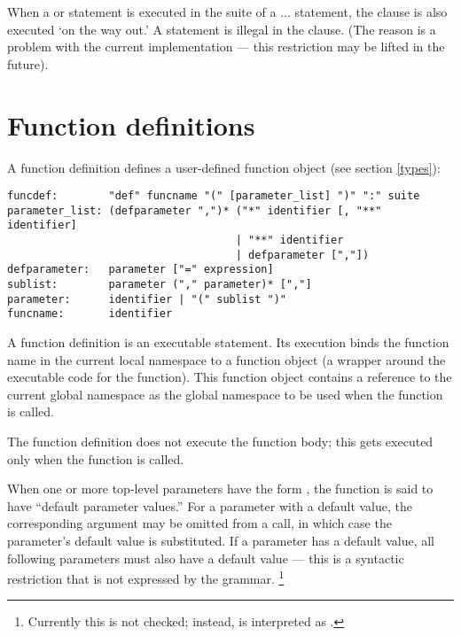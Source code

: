 When a  or  statement is executed in the
 suite of a ... statement, the
 clause is also executed `on the way out.'  A
 statement is illegal in the  clause.  (The
reason is a problem with the current implementation --- this
restriction may be lifted in the future).

\section{Function definitions\label{function}}

A function definition defines a user-defined function object (see
section \ref{types}):

\begin{verbatim}
funcdef:        "def" funcname "(" [parameter_list] ")" ":" suite
parameter_list: (defparameter ",")* ("*" identifier [, "**" identifier] 
                                    | "**" identifier 
                                    | defparameter [","])
defparameter:   parameter ["=" expression]
sublist:        parameter ("," parameter)* [","]
parameter:      identifier | "(" sublist ")"
funcname:       identifier
\end{verbatim}

A function definition is an executable statement.  Its execution binds
the function name in the current local namespace to a function object
(a wrapper around the executable code for the function).  This
function object contains a reference to the current global namespace
as the global namespace to be used when the function is called.

The function definition does not execute the function body; this gets
executed only when the function is called.

When one or more top-level parameters have the form 
\code{=} , the function is said to have ``default
parameter values.''  For a parameter with a
default value, the corresponding argument may be omitted from a call,
in which case the parameter's default value is substituted.  If a
parameter has a default value, all following parameters must also have
a default value --- this is a syntactic restriction that is not
expressed by the grammar.%
\footnote{Currently this is not checked; instead,
 is interpreted as .}

